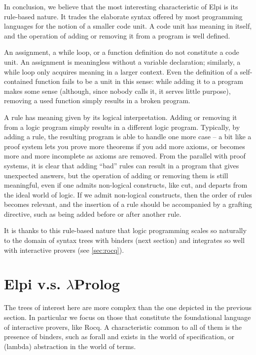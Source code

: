 \documentclass[a4paper, 11pt]{book}
\begin{document}
In conclusion, we believe that the most interesting characteristic of Elpi is
its rule-based nature. It trades the elaborate syntax offered by most
programming languages for the notion of a smaller code unit. A code unit has
meaning in itself, and the operation of adding or removing it from a program
is well defined.

An assignment, a while loop, or a function definition do not constitute a
code unit. An assignment is meaningless without a variable declaration;
similarly, a while loop only acquires meaning in a larger
context. Even the definition of a self-contained function fails to be a unit
in this sense: while adding it to a program makes some sense (although, since
nobody calls it, it serves little purpose), removing a used function simply
results in a broken program.

A rule has meaning given by its logical interpretation. Adding or removing it
from a logic program simply results in a different logic program. Typically,
by adding a rule, the resulting program is able to handle one more case -- a bit
like a proof system lets you prove more theorems if you add more axioms, or
becomes more and more incomplete as axioms are removed. From the parallel
with proof systems, it is clear that adding ``bad'' rules can result in a
program that gives unexpected answers, but the operation of adding or removing
them is still meaningful, even if one admits non-logical constructs, like
cut, and
departs from the ideal world of logic. If we admit non-logical constructs,
then the order of rules becomes relevant, and the insertion of a rule should
be accompanied by a grafting directive, such as being added before or after
another rule.

It is thanks to this rule-based nature that logic programming scales so
naturally to the domain of syntax trees with binders (next section) and
integrates so well with interactive provers (see \cref{sec:rocq}).

\section{Elpi v.s. $\lambda$Prolog}\label{sec:hello}


The trees of interest here are more complex than the one
depicted in the previous section. In particular we focus on those that
constitute the foundational language of interactive provers, like Rocq.
A characteristic common to all of
them is the presence of binders, such as forall and exists in the world of
specification, or (lambda) abstraction in the world of terms.
\end{document}
